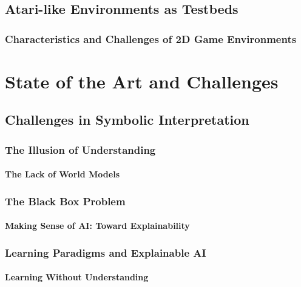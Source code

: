 \documentclass[12pt,a4paper]{report}
\begin{document}
\section{Atari-like Environments as Testbeds}

\subsection{Characteristics and Challenges of 2D Game Environments}


\chapter{State of the Art and Challenges}

\section{Challenges in Symbolic Interpretation}

\subsection{The Illusion of Understanding}

\subsubsection{The Lack of World Models}

\subsection{The Black Box Problem}

\subsubsection{Making Sense of AI: Toward Explainability}

\subsection{Learning Paradigms and Explainable AI}

\subsubsection{Learning Without Understanding}
\end{document}
